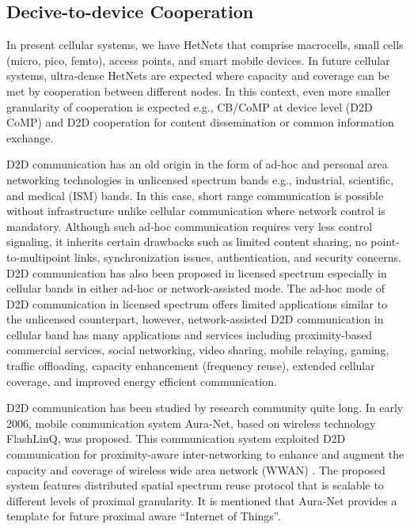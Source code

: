 \documentclass[article,10pt,twocolumn]{IEEEtran}
\begin{document}
\subsection{Decive-to-device Cooperation}\label{sec:d2d_coop}
In present cellular systems, we have HetNets that comprise macrocells, small cells (micro, pico, femto), access points, and smart mobile devices. In future cellular systems, ultra-dense HetNets are expected where capacity and coverage can be met by cooperation between different nodes. In this context, even more smaller granularity of cooperation is expected e.g., CB/CoMP at device level (D2D CoMP) and D2D cooperation for content dissemination or common information exchange.

D2D communication has an old origin in the form of ad-hoc and personal area networking technologies in unlicensed spectrum bands e.g., industrial, scientific, and medical (ISM) bands. In this case, short range communication is possible without infrastructure unlike cellular communication where network control is mandatory. Although such ad-hoc communication requires very less control signaling, it inherits certain drawbacks such as limited content sharing, no point-to-multipoint links, synchronization issues, authentication, and security concerns. D2D communication has also been proposed in licensed spectrum especially in cellular bands in either ad-hoc or network-assisted mode. The ad-hoc mode of D2D communication in licensed spectrum offers limited applications similar to the unlicensed counterpart, however, network-assisted D2D communication in cellular band has many applications and services including proximity-based commercial services, social networking, video sharing, mobile relaying, gaming, traffic offloading, capacity enhancement (frequency reuse), extended cellular coverage, and improved energy efficient communication.

D2D communication has been studied by research community quite long. In early 2006, mobile communication system Aura-Net, based on wireless technology FlashLinQ, was proposed. This communication system exploited D2D communication for proximity-aware inter-networking to enhance and augment the capacity and coverage of wireless wide area network (WWAN) \citep{5675775}. The proposed system features distributed spatial spectrum reuse protocol that is scalable to different levels of proximal granularity. It is mentioned that Aura-Net provides a template for future proximal aware ``Internet of Things''.
\end{document}
